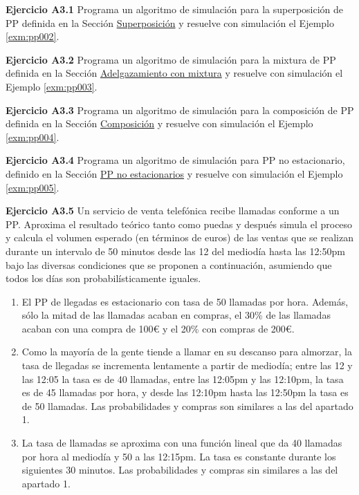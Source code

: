 \documentclass[
]{book}
\providecommand{\tightlist}{%
  \setlength{\itemsep}{0pt}\setlength{\parskip}{0pt}}
\theoremstyle{definition}
\theoremstyle{definition}
\theoremstyle{definition}
\theoremstyle{definition}
\theoremstyle{remark}
\begin{document}
\textbf{Ejercicio A3.1} Programa un algoritmo de simulación para la superposición de PP definida en la Sección \protect\hyperlink{superposicion_pp}{Superposición} y resuelve con simulación el Ejemplo \ref{exm:pp002}.

\textbf{Ejercicio A3.2} Programa un algoritmo de simulación para la mixtura de PP definida en la Sección \protect\hyperlink{adelgazamiento_pp}{Adelgazamiento con mixtura} y resuelve con simulación el Ejemplo \ref{exm:pp003}.

\textbf{Ejercicio A3.3} Programa un algoritmo de simulación para la composición de PP definida en la Sección \protect\hyperlink{composicion_pp}{Composición} y resuelve con simulación el Ejemplo \ref{exm:pp004}.

\textbf{Ejercicio A3.4} Programa un algoritmo de simulación para PP no estacionario, definido en la Sección \protect\hyperlink{pp_noestacionarios}{PP no estacionarios} y resuelve con simulación el Ejemplo \ref{exm:pp005}.

\textbf{Ejercicio A3.5} Un servicio de venta telefónica recibe llamadas conforme a un PP. Aproxima el resultado teórico tanto como puedas y después simula el proceso y calcula el volumen esperado (en términos de euros) de las ventas que se realizan durante un intervalo de 50 minutos desde las 12 del mediodía hasta las 12:50pm bajo las diversas condiciones que se proponen a continuación, asumiendo que todos los días son probabilísticamente iguales.

\begin{enumerate}
\def\labelenumi{\arabic{enumi}.}
\tightlist
\item
  El PP de llegadas es estacionario con tasa de 50 llamadas por hora. Además, sólo la mitad de las llamadas acaban en compras, el 30\% de las llamadas acaban con una compra de 100€ y el 20\% con compras de 200€.
\item
  Como la mayoría de la gente tiende a llamar en su descanso para almorzar, la tasa de llegadas se incrementa lentamente a partir de mediodía; entre las 12 y las 12:05 la tasa es de 40 llamadas, entre las 12:05pm y las 12:10pm, la tasa es de 45 llamadas por hora, y desde las 12:10pm hasta las 12:50pm la tasa es de 50 llamadas. Las probabilidades y compras son similares a las del apartado 1.
\item
  La tasa de llamadas se aproxima con una función lineal que da 40 llamadas por hora al mediodía y 50 a las 12:15pm. La tasa es constante durante los siguientes 30 minutos. Las probabilidades y compras sin similares a las del apartado 1.
\end{enumerate}
\end{document}
